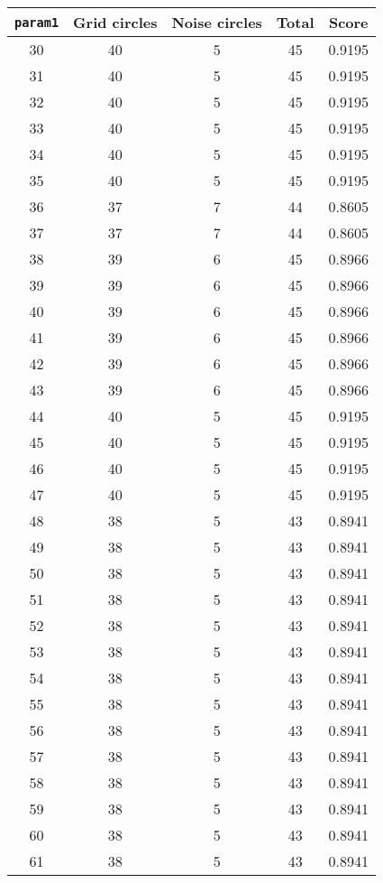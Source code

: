 \documentclass[letterpaper, 12pt]{article}
\begin{document}
\begin{longtable}{|c|c|c|c|c|}
\hline
\textbf{\texttt{param1}} & \textbf{Grid circles} & \textbf{Noise circles} & \textbf{Total} & \textbf{Score} \\
\hline
30 & 40 & 5 & 45 & 0.9195 \\
\hline
31 & 40 & 5 & 45 & 0.9195 \\
\hline
32 & 40 & 5 & 45 & 0.9195 \\
\hline
33 & 40 & 5 & 45 & 0.9195 \\
\hline
34 & 40 & 5 & 45 & 0.9195 \\
\hline
35 & 40 & 5 & 45 & 0.9195 \\
\hline
36 & 37 & 7 & 44 & 0.8605 \\
\hline
37 & 37 & 7 & 44 & 0.8605 \\
\hline
38 & 39 & 6 & 45 & 0.8966 \\
\hline
39 & 39 & 6 & 45 & 0.8966 \\
\hline
40 & 39 & 6 & 45 & 0.8966 \\
\hline
41 & 39 & 6 & 45 & 0.8966 \\
\hline
42 & 39 & 6 & 45 & 0.8966 \\
\hline
43 & 39 & 6 & 45 & 0.8966 \\
\hline
44 & 40 & 5 & 45 & 0.9195 \\
\hline
45 & 40 & 5 & 45 & 0.9195 \\
\hline
46 & 40 & 5 & 45 & 0.9195 \\
\hline
47 & 40 & 5 & 45 & 0.9195 \\
\hline
48 & 38 & 5 & 43 & 0.8941 \\
\hline
49 & 38 & 5 & 43 & 0.8941 \\
\hline
50 & 38 & 5 & 43 & 0.8941 \\
\hline
51 & 38 & 5 & 43 & 0.8941 \\
\hline
52 & 38 & 5 & 43 & 0.8941 \\
\hline
53 & 38 & 5 & 43 & 0.8941 \\
\hline
54 & 38 & 5 & 43 & 0.8941 \\
\hline
55 & 38 & 5 & 43 & 0.8941 \\
\hline
56 & 38 & 5 & 43 & 0.8941 \\
\hline
57 & 38 & 5 & 43 & 0.8941 \\
\hline
58 & 38 & 5 & 43 & 0.8941 \\
\hline
59 & 38 & 5 & 43 & 0.8941 \\
\hline
60 & 38 & 5 & 43 & 0.8941 \\
\hline
61 & 38 & 5 & 43 & 0.8941 \\

\end{longtable}
\end{document}
